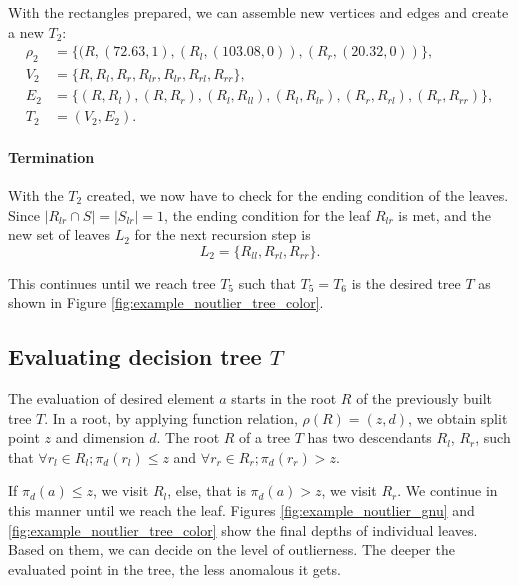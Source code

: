 \begin{example}
With the rectangles prepared, we can assemble new vertices and edges and create a new $T_2$:
\begin{align*}
\rho_2 &= \{(R,(72.63,1), (R_l, (103.08, 0)), (R_r, (20.32, 0)) \},\\
V_2 &= \{ R, R_l, R_r, R_{lr}, R_{lr}, R_{rl}, R_{rr} \},\\
E_2 &= \{ (R,R_l),(R,R_r), (R_l,R_{ll}), (R_l,R_{lr}), (R_r,R_{rl}), (R_r,R_{rr}) \},\\
T_2 &= (V_2, E_2).
\end{align*}

\paragraph{Termination} With the $T_2$ created, we now have to check for the ending condition of the leaves. Since $|R_{lr}\cap S|=|S_{lr}| = 1$, the ending condition for the leaf $R_{lr}$ is met, and the new set of leaves $L_2$ for the next recursion step is
$$L_2 = \{R_{ll},R_{rl},R_{rr}\}.$$

This continues until we reach tree $T_5$ such that $T_5=T_6$ is the desired tree $T$ as shown in Figure \ref{fig:example_noutlier_tree_color}. 
\end{example}


\subsection{Evaluating decision tree $T$}
The evaluation of desired element $a$ starts in the root $R$ of the previously built tree $T$.
In a root, by applying function relation, $\rho(R) = (z,d)$, we obtain split point $z$ and dimension $d$.
The root $R$ of a tree $T$ has two descendants $R_l$, $R_r$, such that
$\forall r_l\in R_l; \pi_d(r_l) \le z$ and $\forall r_r\in R_r; \pi_d(r_r)  > z$.

If $\pi_d(a)\le z$, we visit $R_l$, else, that is $\pi_d(a) > z$, we visit $R_r$.
We continue in this manner until we reach the leaf. Figures \ref{fig:example_noutlier_gnu} and \ref{fig:example_noutlier_tree_color} show the final depths of individual leaves. Based on them, we can decide on the level of outlierness. The deeper the evaluated point in the tree, the less anomalous it gets.

